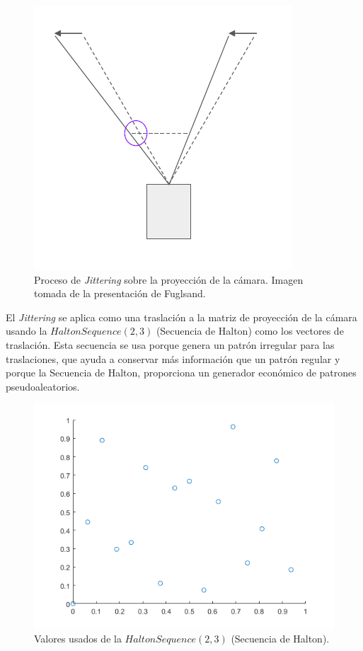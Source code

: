 \documentclass[pregrado]{tesis-usb} %
\begin{document}
\begin{figure}[!hbt]
	\centering
	\includegraphics[scale=0.3]{images/camera_jitter.png}
	\caption{Proceso de \textit{Jittering} sobre la proyección de la cámara. Imagen tomada de la presentación de Fuglsand. \protect\cite{Fuglsand2016}}\label{fig:camerajittering}
\end{figure}

El \textit{Jittering} se aplica como una traslación a la matriz de proyección de la cámara usando la $Halton Sequence (2,3)$ (Secuencia de Halton) como los vectores de traslación. Esta secuencia se usa porque genera un patrón irregular para las traslaciones, que ayuda a conservar más información que un patrón regular y porque la Secuencia de Halton, proporciona un generador económico de patrones pseudoaleatorios. ~\cite{Fuglsand2016, XU2016}

\begin{figure}[!hbt]
	\centering
	\includegraphics[scale=0.5]{images/halton_16.png}
	\caption{Valores usados de la $Halton Sequence (2,3)$ (Secuencia de Halton).}\label{fig:halton16}
\end{figure}
\end{document}
